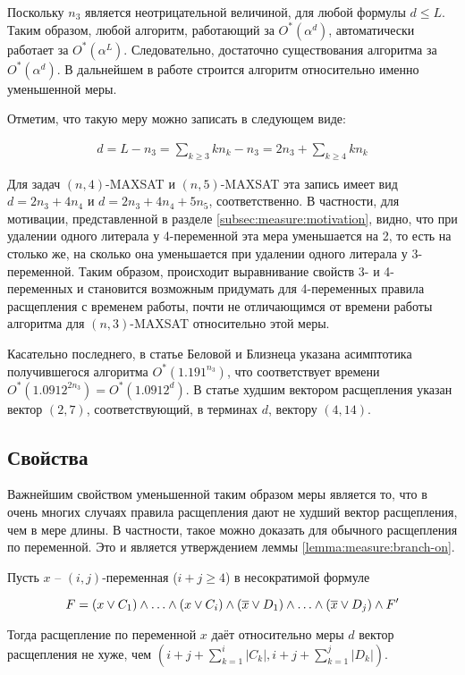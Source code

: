 Поскольку $n_3$ является неотрицательной величиной, для любой формулы $d \leq L$. Таким образом, любой алгоритм, работающий за $O^*(\alpha^d)$, автоматически работает за $O^*(\alpha^L)$. Следовательно, достаточно существования алгоритма за $O^*(\alpha^d)$. В дальнейшем в работе строится алгоритм относительно именно уменьшенной меры.

Отметим, что такую меру можно записать в следующем виде:

\begin{gather}
 d = L - n_3 = \sum_{k \geq 3} kn_k - n_3 = 2n_3 + \sum_{k \geq 4} kn_k
 \label{formula:discounted-length}
\end{gather}

Для задач $(n,4)$-MAXSAT и $(n,5)$-MAXSAT эта запись имеет вид $d = 2n_3 + 4n_4$ и $d = 2n_3 + 4n_4 + 5n_5$, соответственно. В частности, для мотивации, представленной в разделе \ref{subsec:measure:motivation}, видно, что при удалении одного литерала у 4-переменной эта мера уменьшается на 2, то есть на столько же, на сколько она уменьшается при удалении одного литерала у 3-переменной. Таким образом, происходит выравнивание свойств 3- и 4-переменных и становится возможным придумать для 4-переменных правила расщепления с временем работы, почти не отличающимся от времени работы алгоритма для $(n,3)$-MAXSAT относительно этой меры.

Касательно последнего, в статье Беловой и Близнеца \cite{belova18} указана асимптотика получившегося алгоритма $O^*(1.191^{n_3})$, что соответствует времени $O^*(1.0912^{2n_3}) = O^*(1.0912^d)$. В статье худшим вектором расщепления указан вектор $(2,7)$, соответствующий, в терминах $d$, вектору $(4,14)$.

\subsection{Свойства}
\label{subsec:measure:properties}

\firstpar{}Важнейшим свойством уменьшенной таким образом меры является то, что в очень многих случаях правила расщепления дают не худший вектор расщепления, чем в мере длины. В частности, такое можно доказать для обычного расщепления по переменной. Это и является утверждением леммы \ref{lemma:measure:branch-on}.

\begin{lemma}
 Пусть $x$ -- $(i,j)$-переменная ($i + j \geq 4$) в несократимой формуле

 $$
  F =
  (x \vee C_1) \wedge
  \ldots \wedge
  (x \vee C_i) \wedge
  (\overline{x} \vee D_1) \wedge
  \ldots \wedge
  (\overline{x} \vee D_j) \wedge
  F'
 $$

 Тогда расщепление по переменной $x$ даёт относительно меры $d$ вектор расщепления не хуже, чем $(i + j + \sum\limits_{k=1}^i |C_k|, i + j + \sum\limits_{k=1}^j |D_k|)$.
 \label{lemma:measure:branch-on}
\end{lemma}

